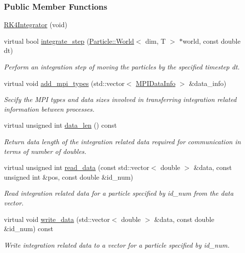 \subsubsection*{Public Member Functions}
\begin{DoxyCompactItemize}
\item 
\hyperlink{classps__mmm_1_1_particle_1_1_integrator_1_1_r_k4_integrator_aaf17df02e923c3c14296b0f258f814eb}{R\+K4\+Integrator} (void)
\item 
virtual bool \hyperlink{classps__mmm_1_1_particle_1_1_integrator_1_1_r_k4_integrator_af78a876c921bcb77524577cf8aae8a5f}{integrate\+\_\+step} (\hyperlink{classps__mmm_1_1_particle_1_1_world}{Particle\+::\+World}$<$ dim, T $>$ $\ast$world, const double dt)
\begin{DoxyCompactList}\small\item\em Perform an integration step of moving the particles by the specified timestep dt. \end{DoxyCompactList}\item 
virtual void \hyperlink{classps__mmm_1_1_particle_1_1_integrator_1_1_r_k4_integrator_a6021066cc7b9cdbe02f8d5bff323dd05}{add\+\_\+mpi\+\_\+types} (std\+::vector$<$ \hyperlink{classps__mmm_1_1_particle_1_1_m_p_i_data_info}{M\+P\+I\+Data\+Info} $>$ \&data\+\_\+info)
\begin{DoxyCompactList}\small\item\em Secify the M\+P\+I types and data sizes involved in transferring integration related information between processes. \end{DoxyCompactList}\item 
virtual unsigned int \hyperlink{classps__mmm_1_1_particle_1_1_integrator_1_1_r_k4_integrator_a19816521254f71ff265ec3b8ba09d75e}{data\+\_\+len} () const 
\begin{DoxyCompactList}\small\item\em Return data length of the integration related data required for communication in terms of number of doubles. \end{DoxyCompactList}\item 
virtual unsigned int \hyperlink{classps__mmm_1_1_particle_1_1_integrator_1_1_r_k4_integrator_afa56d11f05cb72bd477c9c84500d23a0}{read\+\_\+data} (const std\+::vector$<$ double $>$ \&data, const unsigned int \&pos, const double \&id\+\_\+num)
\begin{DoxyCompactList}\small\item\em Read integration related data for a particle specified by id\+\_\+num from the data vector. \end{DoxyCompactList}\item 
virtual void \hyperlink{classps__mmm_1_1_particle_1_1_integrator_1_1_r_k4_integrator_a772ef119072e53dce408b8680872462b}{write\+\_\+data} (std\+::vector$<$ double $>$ \&data, const double \&id\+\_\+num) const 
\begin{DoxyCompactList}\small\item\em Write integration related data to a vector for a particle specified by id\+\_\+num. \end{DoxyCompactList}\end{DoxyCompactItemize}


